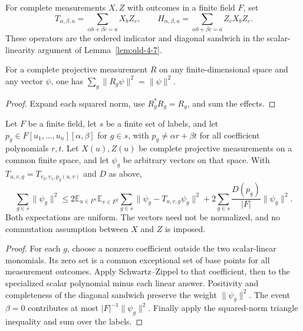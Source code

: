 \begin{definition}
\label{def:qld-polynomial-indicators}
\leanok
For complete measurements $X,Z$ with outcomes in a finite field $F$, set
\[
 T_{\alpha,\beta,a}=\sum_{\alpha b+\beta c=a}X_bZ_c,
 \qquad H_{\alpha,\beta,a}=\sum_{\alpha b+\beta c=a}Z_cX_bZ_c.
\]
These operators are the ordered indicator and diagonal sandwich in the
scalar-linearity argument of Lemma~\ref{lem:qld-4-7}.
\end{definition}

\begin{theorem}
\label{thm:qld-projective-outcome-mass}
\leanok
For a complete projective measurement $R$ on any finite-dimensional
space and any vector $\psi$, one has $\sum_g\|R_g\psi\|^2=\|\psi\|^2$.
\end{theorem}
\begin{proof}
\leanok
Expand each squared norm, use $R_g^*R_g=R_g$, and sum the effects.
\end{proof}

\begin{theorem}
\label{thm:qld-nonlinear-mass-ordered-error}
\leanok
Let $F$ be a finite field, let $s$ be a finite set of labels, and let
$p_g\in F[u_1,\ldots,u_n][\alpha,\beta]$ for $g\in s$, with
$p_g\ne\alpha r+\beta t$ for all coefficient polynomials $r,t$.
Let $X(u),Z(u)$ be complete projective measurements on a common finite
space, and let $\psi_g$ be arbitrary vectors on that space. With
$T_{u,v,g}=T_{v_0,v_1,p_g(u,v)}$ and $D$ as above,
\[
 \sum_{g\in s}\|\psi_g\|^2\leq
 2\mathbb E_{u\in F^n}\mathbb E_{v\in F^2}
   \sum_{g\in s}\|\psi_g-T_{u,v,g}\psi_g\|^2
 +2\sum_{g\in s}\frac{D(p_g)}{|F|}\|\psi_g\|^2.
\]
Both expectations are uniform. The vectors need not be normalized, and
no commutation assumption between $X$ and $Z$ is imposed.
\end{theorem}
\begin{proof}
\leanok
{}
For each $g$, choose a nonzero coefficient outside the two scalar-linear
monomials. Its zero set is a common exceptional set of base points for
all measurement outcomes. Apply Schwartz--Zippel to that coefficient,
then to the specialized scalar polynomial minus each linear answer.
Positivity and completeness of the diagonal sandwich preserve the weight
$\|\psi_g\|^2$. The event $\beta=0$ contributes at most
$|F|^{-1}\|\psi_g\|^2$. Finally apply the squared-norm triangle inequality
and sum over the labels.
\end{proof}

